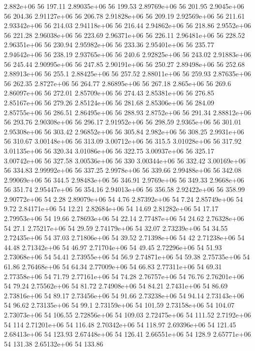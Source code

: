 2.882e+06 56 197.11
2.89035e+06 56 199.53
2.89769e+06 56 201.95
2.9045e+06 56 204.36
2.91127e+06 56 206.78
2.91828e+06 56 209.19
2.92569e+06 56 211.61
2.93342e+06 56 214.03
2.94118e+06 56 216.44
2.94862e+06 56 218.86
2.9552e+06 56 221.28
2.96038e+06 56 223.69
2.96371e+06 56 226.11
2.96481e+06 56 228.52
2.96351e+06 56 230.94
2.95982e+06 56 233.36
2.95401e+06 56 235.77
2.94642e+06 56 238.19
2.93765e+06 56 240.6
2.92825e+06 56 243.02
2.91883e+06 56 245.44
2.90995e+06 56 247.85
2.90191e+06 56 250.27
2.89498e+06 56 252.68
2.88913e+06 56 255.1
2.88425e+06 56 257.52
2.88011e+06 56 259.93
2.87635e+06 56 262.35
2.8727e+06 56 264.77
2.86895e+06 56 267.18
2.865e+06 56 269.6
2.86097e+06 56 272.01
2.85709e+06 56 274.43
2.85381e+06 56 276.85
2.85167e+06 56 279.26
2.85124e+06 56 281.68
2.85306e+06 56 284.09
2.85755e+06 56 286.51
2.86495e+06 56 288.93
2.8752e+06 56 291.34
2.88812e+06 56 293.76
2.90308e+06 56 296.17
2.91952e+06 56 298.59
2.9365e+06 56 301.01
2.95308e+06 56 303.42
2.96852e+06 56 305.84
2.982e+06 56 308.25
2.9931e+06 56 310.67
3.00148e+06 56 313.09
3.00712e+06 56 315.5
3.01028e+06 56 317.92
3.01135e+06 56 320.34
3.01086e+06 56 322.75
3.00937e+06 56 325.17
3.00742e+06 56 327.58
3.00536e+06 56 330
3.00344e+06 56 332.42
3.00169e+06 56 334.83
2.99992e+06 56 337.25
2.9978e+06 56 339.66
2.99488e+06 56 342.08
2.99069e+06 56 344.5
2.98483e+06 56 346.91
2.9769e+06 56 349.33
2.9668e+06 56 351.74
2.95447e+06 56 354.16
2.94013e+06 56 356.58
2.92422e+06 56 358.99
2.90772e+06 54 2.28
2.89079e+06 54 4.76
2.87392e+06 54 7.24
2.85749e+06 54 9.72
2.84171e+06 54 12.21
2.82684e+06 54 14.69
2.81282e+06 54 17.17
2.79953e+06 54 19.66
2.78693e+06 54 22.14
2.77487e+06 54 24.62
2.76328e+06 54 27.1
2.75217e+06 54 29.59
2.74179e+06 54 32.07
2.73239e+06 54 34.55
2.72435e+06 54 37.03
2.71806e+06 54 39.52
2.71398e+06 54 42
2.71238e+06 54 44.48
2.71342e+06 54 46.97
2.71704e+06 54 49.45
2.72296e+06 54 51.93
2.73068e+06 54 54.41
2.73955e+06 54 56.9
2.74871e+06 54 59.38
2.75735e+06 54 61.86
2.76468e+06 54 64.34
2.77009e+06 54 66.83
2.77311e+06 54 69.31
2.77358e+06 54 71.79
2.77161e+06 54 74.28
2.76757e+06 54 76.76
2.76201e+06 54 79.24
2.75562e+06 54 81.72
2.74908e+06 54 84.21
2.7431e+06 54 86.69
2.73816e+06 54 89.17
2.73456e+06 54 91.66
2.73238e+06 54 94.14
2.73143e+06 54 96.62
2.73135e+06 54 99.1
2.73159e+06 54 101.59
2.73158e+06 54 104.07
2.73073e+06 54 106.55
2.72856e+06 54 109.03
2.72475e+06 54 111.52
2.7192e+06 54 114
2.71201e+06 54 116.48
2.70342e+06 54 118.97
2.69396e+06 54 121.45
2.68413e+06 54 123.93
2.67448e+06 54 126.41
2.66551e+06 54 128.9
2.65771e+06 54 131.38
2.65132e+06 54 133.86
